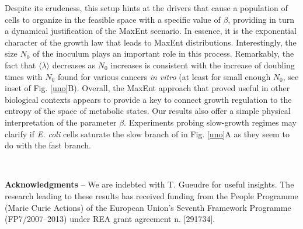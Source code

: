 \documentclass[superscriptaddress,amsmath,amssymb,twocolumn]{revtex4-1}
\begin{document}
Despite its crudeness, this setup hints at the drivers that cause a population of cells to organize in the feasible space with a specific value of $\beta$, providing in turn a dynamical justification of the MaxEnt scenario. In essence, it is the  exponential character of the growth law that leads to MaxEnt distributions. Interestingly, the size $N_0$ of the inoculum plays an important role in this process. Remarkably, the fact that $\langle\lambda \rangle$ decreases as $N_0$ increases is  consistent with the increase of doubling times with $N_0$ found for various cancers {\it in vitro} (at least for small enough $N_0$, see inset of Fig. \ref{uno}B). Overall, the MaxEnt approach that proved useful in other biological contexts \cite{mora} appears to provide a key to connect growth regulation to the entropy of the space of metabolic states. Our results also offer a simple physical interpretation of the parameter $\beta$. Experiments probing slow-growth regimes may clarify if {\it E. coli} cells saturate the slow branch of in Fig. \ref{uno}A as they seem to do with the fast branch.

~

\footnotesize{{\bf Acknowledgments} -- We are indebted with T. Gueudre for useful insights. The research leading to these results has received funding from the People Programme (Marie Curie Actions) of the European Union's Seventh Framework Programme (FP7/2007--2013) under REA grant agreement n. [291734].}

\end{document}
